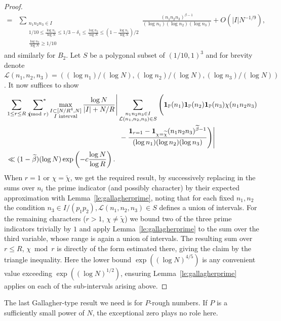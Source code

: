 \documentclass[12pt]{amsart}
\theoremstyle{definition}
\theoremstyle{remark}
\numberwithin{equation}{section}
\newcommand{\asum}{\sideset{}{^{\ast}}\sum}
\newcommand{\1}{\mathbf{1}}
\let\oldpmod\pmod
\renewcommand{\pmod}[1]{\hspace{-0.12cm}\oldpmod {#1}}
\begin{document}
\begin{proof}
\begin{align*}
    =& \sum_{\substack{n_1 n_2 n_3\in I\\ 1/10\leq \frac{\log n_1}{\log N}\leq 1/3-\delta_1\leq \frac{\log n_2}{\log N}\leq (1-\frac{\log n_1}{\log N})/2 \\ \frac{\log n_3}{\log N}\geq 1/10}} \frac{(n_1n_2n_3)^{\beta-1}}{(\log n_1)(\log n_2)(\log n_3)}+O(|I|N^{-1/9}),
\end{align*}
and similarly for $B_2$. Let $S$ be a polygonal subset of $(1/10,1)^3$ and for brevity denote $\mathcal{L}(n_1,n_2,n_3)=((\log n_1)/(\log N),(\log n_2)/(\log N),(\log n_3)/(\log N))$.  It now suffices to show
\begin{align*}
&\sum_{1\leq r\leq R}\,\,\asum_{\chi\pmod r}\max_{\substack{I\subset [N/R^4,N]\\I \textnormal{ interval}}}\frac{\log N}{|I|+N/R} \Bigg|\sum_{\substack{n_1n_2n_3\in I\\ \mathcal{L}(n_1,n_2,n_3)\in S}}\Bigg(\1_{\mathbb{P}}(n_1)\1_{\mathbb{P}}(n_2)\1_{\mathbb{P}}(n_3)\chi(n_1n_2n_3)\\
&\qquad \qquad \qquad \qquad \qquad \qquad \qquad \qquad  -\frac{\1_{r=1}-\1_{\chi=\widetilde{\chi}}(n_1n_2n_3)^{\widetilde{\beta}-1}}{(\log n_1)(\log n_2)(\log n_3)}\Bigg)\Bigg|\\
&\ll (1-\widetilde{\beta})(\log N)\exp\left(-c \frac{\log N}{\log R}\right).
\end{align*}
When $r=1$ or $\chi=\widetilde{\chi}$, we get the required result, by successively replacing in the sums over $n_i$ the prime indicator (and possibly character) by their expected approximation with Lemma~\ref{le:gallagherprime}, noting that for each fixed $n_1, n_2$ the condition $n_3\in I/(p_1p_2), \mathcal{L}(n_1,n_2,n_3)\in S$ defines a union of intervals. For the remaining characters ($r>1$, $\chi\ne\widetilde{\chi}$) we bound two of the three prime indicators trivially by $1$ and apply Lemma~\ref{le:gallagherprime} to the sum over the third variable, whose range is again a union of intervals. The resulting sum over $r\le R$, $\chi\bmod r$ is directly of the form estimated there, giving the claim by the triangle inequality. Here the lower bound $\exp((\log N)^{4/5})$ is any convenient value exceeding $\exp((\log N)^{1/2})$, ensuring Lemma~\ref{le:gallagherprime} applies on each of the sub-intervals arising above.
\end{proof}


The last Gallagher-type result we need is for $P$-rough numbers. If $P$ is a sufficiently small power of $N$, the exceptional zero plays no role here.
\end{document}
